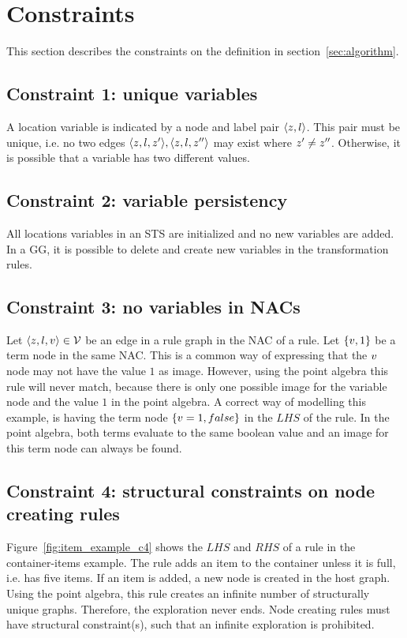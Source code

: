 \section{Constraints}

This section describes the constraints on the definition in section~\ref{sec:algorithm}.

\subsection{Constraint 1: unique variables}\label{sec:constraint-1}
A location variable is indicated by a node and label pair $\langle z, l\rangle$. This pair must be unique, i.e. no two edges $\langle z, l, z'\rangle, \langle z, l, z''\rangle$ may exist where $z' \neq z''$. Otherwise, it is possible that a variable has two different values.

\subsection{Constraint 2: variable persistency}
All locations variables in an STS are initialized and no new variables are added. In a GG, it is possible to delete and create new variables in the transformation rules. 

\subsection{Constraint 3: no variables in NACs}
Let $\langle z, l, v \rangle\in \mathcal{V}$ be an edge in a rule graph in the NAC of a rule. Let $\{v, 1\}$ be a term node in the same NAC. This is a common way of expressing that the $v$ node may not have the value $1$ as image. However, using the point algebra this rule will never match, because there is only one possible image for the variable node and the value $1$ in the point algebra. A correct way of modelling this example, is having the term node $\{v = 1, false\}$ in the $\mathit{LHS}$ of the rule. In the point algebra, both terms evaluate to the same boolean value and an image for this term node can always be found.

\subsection{Constraint 4: structural constraints on node creating rules}
Figure~\ref{fig:item_example_c4} shows the $\mathit{LHS}$ and $\mathit{RHS}$ of a rule in the container-items example. The rule adds an item to the container unless it is full, i.e. has five items. If an item is added, a new node is created in the host graph. Using the point algebra, this rule creates an infinite number of structurally unique graphs. Therefore, the exploration never ends. Node creating rules must have structural constraint(s), such that an infinite exploration is prohibited.

